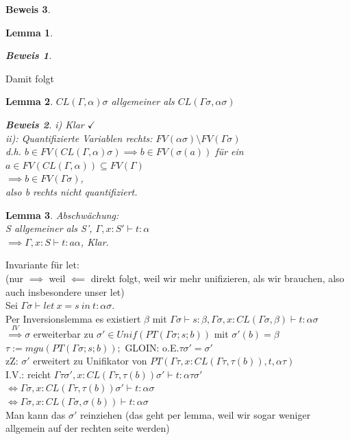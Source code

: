 \documentclass{article}
\newtheorem{lemma}{Lemma}[section]
\theoremstyle{definition}
\newtheorem{beweis}{Beweis}[section]
\begin{document}
\begin{beweis}
\begin{lemma}
\begin{beweis}
	\end{beweis}
	\end{lemma}
	Damit folgt
	\begin{lemma} $CL(\Gamma,\alpha)\sigma$ allgemeiner als $CL(\Gamma\sigma,\alpha\sigma)$\\
	\begin{beweis} i) Klar $\checkmark$\\
	ii): Quantifizierte Variablen rechts: $FV(\alpha\sigma)\setminus FV(\Gamma\sigma)$\\
	d.h. $b\in FV(CL(\Gamma,\alpha)\sigma)\implies b\in FV(\sigma(a))$ für ein $a\in FV(CL(\Gamma,\alpha))\subseteq FV(\Gamma)$\\
	$\implies b\in FV(\Gamma\sigma)$,\\
	also b rechts nicht quantifiziert.\\
	\end{beweis}
	\end{lemma}
	\begin{lemma} Abschwächung:\\
	S allgemeiner als S', $\Gamma,x:S'\vdash t:\alpha$\\
	$\implies \Gamma,x:S\vdash t:a\alpha$, Klar.
	\end{lemma}
	Invariante für let:\\
	(nur $\implies$ weil $\impliedby$ direkt folgt, weil wir mehr unifizieren, als wir brauchen, also auch insbesondere unser let)\\
	Sei $\Gamma\sigma\vdash let\ x= s\ in\ t:\alpha\sigma$.\\
	Per Inversionslemma es existiert $\beta$ mit $\Gamma\sigma\vdash s:\beta,\Gamma\sigma,x:CL(\Gamma\sigma,\beta)\vdash t:\alpha\sigma$\\
	$\stackrel{IV}{\implies}\sigma$ erweiterbar zu $\sigma'\in Unif(PT(\Gamma\sigma;s;b))$ mit $\sigma'(b)=\beta$\\
	$\tau:=mgu(PT(\Gamma\sigma;s;b));$ GLOIN: o.E.$\tau\sigma'=\sigma'$\\
	zZ: $\sigma'$ erweitert zu Unifikator von $PT(\Gamma\tau, x:CL(\Gamma\tau,\tau(b)),t,\alpha\tau)$\\
	I.V.: reicht $\Gamma\tau\sigma',x:CL(\Gamma\tau,\tau(b))\sigma'\vdash t:\alpha\tau\sigma'$\\
	$\iff \Gamma\sigma,x:CL(\Gamma\tau,\tau(b))\sigma'\vdash t:\alpha\sigma$\\
	$\iff \Gamma\sigma,x:CL(\Gamma\sigma,\sigma(b))\vdash t:\alpha\sigma$\\
	Man kann das $\sigma'$ reinziehen (das geht per lemma, weil wir sogar weniger allgemein auf der rechten seite werden)
	\end{beweis}
\end{document}
